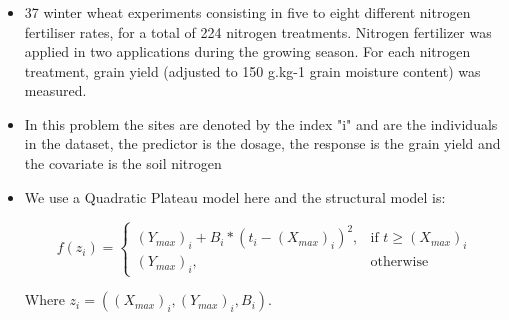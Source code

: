 \documentclass[xcolor={dvipsnames}]{beamer}
\begin{document}
\begin{frame}
\frametitle{}

\begin{itemize}
\item 37 winter wheat experiments consisting in five to eight different nitrogen fertiliser rates, for a total of 224 nitrogen treatments. Nitrogen fertilizer was applied in two applications during the growing season. For each nitrogen treatment, grain yield (adjusted to 150 g.kg-1 grain moisture content) was measured.
\item In this problem the sites are denoted by the index "i" and are the individuals in the dataset, the predictor is the dosage, the response is the grain yield and the covariate is the soil nitrogen

\item We use a Quadratic Plateau model here and the structural model is:




\begin{block}{}
\begin{equation}
    f(z_i)= 
\begin{cases}
    (Y_{max})_i + B_i*(t_i-(X_{max})_i)^2 ,& \text{if } t\geq (X_{max})_i\\
    (Y_{max})_i,              & \text{otherwise}
\end{cases}
\end{equation}
\end{block}
Where $z_i=((X_{max})_i,(Y_{max})_i,B_i)$.


\end{itemize}
\end{frame}
\end{document}

